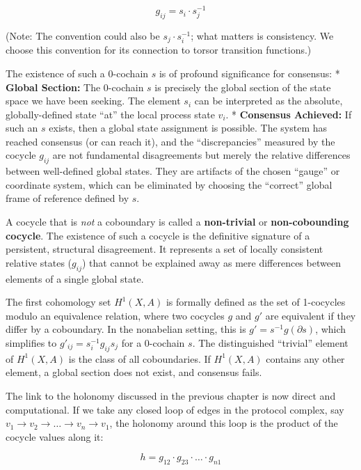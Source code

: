 \documentclass[
]{article}
\begin{document}
\[g_{ij} = s_i \cdot s_j^{-1}\]

(Note: The convention could also be \(s_j \cdot s_i^{-1}\); what matters
is consistency. We choose this convention for its connection to torsor
transition functions.)

The existence of such a 0-cochain \(s\) is of profound significance for
consensus: * \textbf{Global Section:} The 0-cochain \(s\) is precisely
the global section of the state space we have been seeking. The element
\(s_i\) can be interpreted as the absolute, globally-defined state
``at'' the local process state \(v_i\). * \textbf{Consensus Achieved:}
If such an \(s\) exists, then a global state assignment is possible. The
system has reached consensus (or can reach it), and the
``discrepancies'' measured by the cocycle \(g_{ij}\) are not fundamental
disagreements but merely the relative differences between well-defined
global states. They are artifacts of the chosen ``gauge'' or coordinate
system, which can be eliminated by choosing the ``correct'' global frame
of reference defined by \(s\).

A cocycle that is \emph{not} a coboundary is called a
\textbf{non-trivial} or \textbf{non-cobounding cocycle}. The existence
of such a cocycle is the definitive signature of a persistent,
structural disagreement. It represents a set of locally consistent
relative states (\(g_{ij}\)) that cannot be explained away as mere
differences between elements of a single global state.

The first cohomology set \(H^1(X, A)\) is formally defined as the set of
1-cocycles modulo an equivalence relation, where two cocycles \(g\) and
\(g'\) are equivalent if they differ by a coboundary. In the nonabelian
setting, this is \(g' = s^{-1} g (\partial s)\), which simplifies to
\(g'_{ij} = s_i^{-1} g_{ij} s_j\) for a 0-cochain \(s\). The
distinguished ``trivial'' element of \(H^1(X, A)\) is the class of all
coboundaries. If \(H^1(X, A)\) contains any other element, a global
section does not exist, and consensus fails.

The link to the holonomy discussed in the previous chapter is now direct
and computational. If we take any closed loop of edges in the protocol
complex, say \(v_1 \to v_2 \to \dots \to v_n \to v_1\), the holonomy
around this loop is the product of the cocycle values along it:

\[h = g_{12} \cdot g_{23} \cdot \dots \cdot g_{n1}\]
\end{document}

